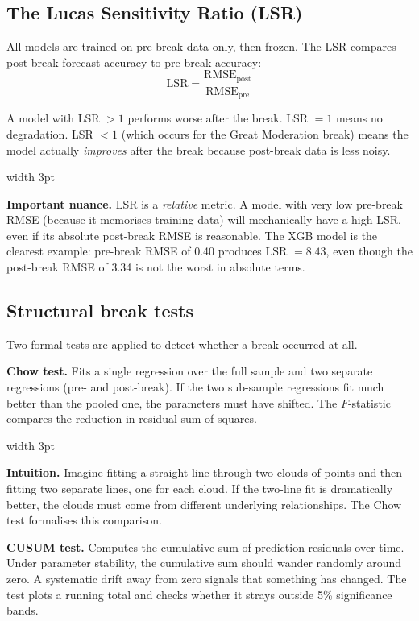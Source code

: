 \documentclass[11pt, a4paper]{article}
\newenvironment{intubox}{%
  \vspace{4pt}\par\noindent%
  {\color{darkblue}\vrule width 3pt}\hspace{6pt}%
  \begin{minipage}{\dimexpr\linewidth-9pt\relax}\vspace{2pt}%
}{%
  \vspace{2pt}\end{minipage}\par\vspace{4pt}%
}
\newenvironment{notebox}{%
  \vspace{4pt}\par\noindent%
  {\color{gold}\vrule width 3pt}\hspace{6pt}%
  \begin{minipage}{\dimexpr\linewidth-9pt\relax}\vspace{2pt}%
}{%
  \vspace{2pt}\end{minipage}\par\vspace{4pt}%
}
\newcommand{\LSR}{\mathrm{LSR}}
\begin{document}
\subsection{The Lucas Sensitivity Ratio (LSR)}

All models are trained on pre-break data only, then frozen. The LSR compares
post-break forecast accuracy to pre-break accuracy:
\[
  \LSR = \frac{\text{RMSE}_\text{post}}{\text{RMSE}_\text{pre}}
\]

A model with LSR $>1$ performs worse after the break. LSR $=1$ means no
degradation. LSR $<1$ (which occurs for the Great Moderation break) means the
model actually \emph{improves} after the break because post-break data is less
noisy.

\begin{notebox}
\textbf{Important nuance.}
LSR is a \emph{relative} metric. A model with very low pre-break RMSE (because
it memorises training data) will mechanically have a high LSR, even if its
absolute post-break RMSE is reasonable. The XGB model is the clearest example:
pre-break RMSE of 0.40 produces LSR $=8.43$, even though the post-break RMSE of
3.34 is not the worst in absolute terms.
\end{notebox}

\subsection{Structural break tests}

Two formal tests are applied to detect whether a break occurred at all.

\textbf{Chow test.} Fits a single regression over the full sample and two
separate regressions (pre- and post-break). If the two sub-sample regressions
fit much better than the pooled one, the parameters must have shifted. The
$F$-statistic compares the reduction in residual sum of squares.

\begin{intubox}
\textbf{Intuition.}
Imagine fitting a straight line through two clouds of points and then fitting
two separate lines, one for each cloud. If the two-line fit is dramatically
better, the clouds must come from different underlying relationships. The Chow
test formalises this comparison.
\end{intubox}

\textbf{CUSUM test.} Computes the cumulative sum of prediction residuals over
time. Under parameter stability, the cumulative sum should wander randomly
around zero. A systematic drift away from zero signals that something has
changed. The test plots a running total and checks whether it strays outside
5\% significance bands.
\end{document}
